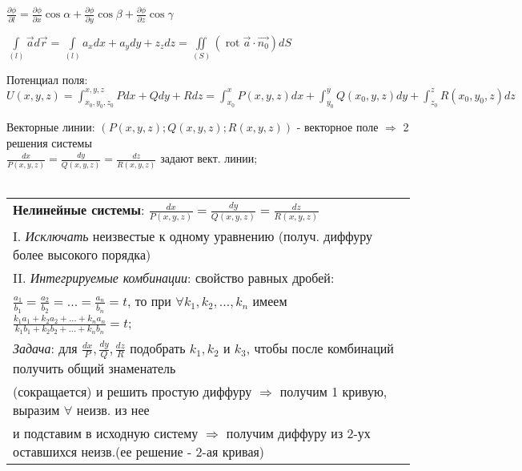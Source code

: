 $\displaystyle\frac{\partial\phi}{\partial{l}} = \frac{\partial\phi}{\partial{x}}\cos{\alpha} + \frac{\partial\phi}{\partial{y}}\cos{\beta} + \frac{\partial\phi}{\partial{z}}\cos{\gamma}$

$\displaystyle\int\limits_{(l)}\vec{a}d\vec{r} = \int\limits_{(l)}a_xdx+a_ydy+z_zdz = \iint\limits_{(S)}(\operatorname{rot}\vec{a}\cdot\vec{n_0})dS$

Потенциал поля: $\displaystyle
U(x,y,z) = \int_{x_0, y_0, z_0}^{x,y,z} Pdx+Qdy+Rdz =
\int_{x_0}^{x} P(x,y,z)dx + \int_{y_0}^{y}Q(x_0,y,z)dy +
\int_{z_0}^{z} R(x_0,y_0,z)dz$

Векторные линии: $\displaystyle (P(x,y,z);Q(x,y,z);R(x,y,z))$ - векторное поле $\Rightarrow $ 2 решения системы \\ 
$\displaystyle \frac{dx}{P(x,y,z)} = \frac{dy}{Q(x,y,z)} = \frac{dz}{R(x,y,z)}$ задают вект. линии; 
\\
\\
\begin{tabular}{|l|}
	\hline
	\textbf{Нелинейные системы}: $\displaystyle\frac{dx}{P(x,y,z)} = \frac{dy}{Q(x,y,z)} = \frac{dz}{R(x,y,z)}$ \\
	I. \textit{Исключать} неизвестые к одному уравнению (получ. диффуру более высокого порядка) \\
	II. \textit{Интегрируемые комбинации}: свойство равных дробей: \\ 
	$\displaystyle \frac{a_1}{b_1} = \frac{a_2}{b_2} = ... = \frac{a_n}{b_n} = t$, то при $\forall k_1, k_2,...,k_n$ имеем
	$\displaystyle \frac{k_1a_1 + k_2a_2+...+k_na_n}{k_1b_1 + k_2b_2 +...+k_nb_n} = t$; \\ 
	\textit{Задача}: для $\displaystyle \frac{dx}{P},\frac{dy}{Q},\frac{dz}{R}$ подобрать $k_1,k_2$ и $k_3$, чтобы после комбинаций получить общий знаменатель \\
	(сокращается) и решить простую диффуру $\Rightarrow$ получим 1 кривую, выразим $\forall$ неизв. из нее \\ 
	и подставим в исходную систему $\Rightarrow$ получим диффуру из 2-ух оставшихся неизв.(ее решение - 2-ая кривая) \\
	
	
	\hline
\end{tabular}

